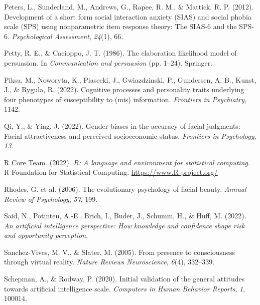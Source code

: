 \documentclass[
  man,floatsintext]{apa6}
\newlength{\cslhangindent}
\newlength{\cslentryspacingunit} %
\newenvironment{CSLReferences}[2] %
 {%
  \setlength{\parindent}{0pt}
  \ifodd #1
  \let\oldpar\par
  \def\par{\hangindent=\cslhangindent\oldpar}
  \fi
  \setlength{\parskip}{#2\cslentryspacingunit}
 }%
 {}
\begin{document}
\begin{CSLReferences}{1}{0}
\leavevmode{}%
Peters, L., Sunderland, M., Andrews, G., Rapee, R. M., \& Mattick, R. P. (2012). Development of a short form social interaction anxiety (SIAS) and social phobia scale (SPS) using nonparametric item response theory: The SIAS-6 and the SPS-6. \emph{Psychological Assessment}, \emph{24}(1), 66.

\leavevmode{}%
Petty, R. E., \& Cacioppo, J. T. (1986). The elaboration likelihood model of persuasion. In \emph{Communication and persuasion} (pp. 1--24). Springer.

\leavevmode{}%
Piksa, M., Noworyta, K., Piasecki, J., Gwiazdzinski, P., Gundersen, A. B., Kunst, J., \& Rygula, R. (2022). Cognitive processes and personality traits underlying four phenotypes of susceptibility to (mis) information. \emph{Frontiers in Psychiatry}, 1142.

\leavevmode{}%
Qi, Y., \& Ying, J. (2022). Gender biases in the accuracy of facial judgments: Facial attractiveness and perceived socioeconomic status. \emph{Frontiers in Psychology}, \emph{13}.

\leavevmode{}%
R Core Team. (2022). \emph{R: A language and environment for statistical computing}. R Foundation for Statistical Computing. \url{https://www.R-project.org/}

\leavevmode{}%
Rhodes, G. et al. (2006). The evolutionary psychology of facial beauty. \emph{Annual Review of Psychology}, \emph{57}, 199.

\leavevmode{}%
Said, N., Potinteu, A.-E., Brich, I., Buder, J., Schumm, H., \& Huff, M. (2022). \emph{An artificial intelligence perspective: How knowledge and confidence shape risk and opportunity perception}.

\leavevmode{}%
Sanchez-Vives, M. V., \& Slater, M. (2005). From presence to consciousness through virtual reality. \emph{Nature Reviews Neuroscience}, \emph{6}(4), 332--339.

\leavevmode{}%
Schepman, A., \& Rodway, P. (2020). Initial validation of the general attitudes towards artificial intelligence scale. \emph{Computers in Human Behavior Reports}, \emph{1}, 100014.


\end{CSLReferences}
\end{document}
